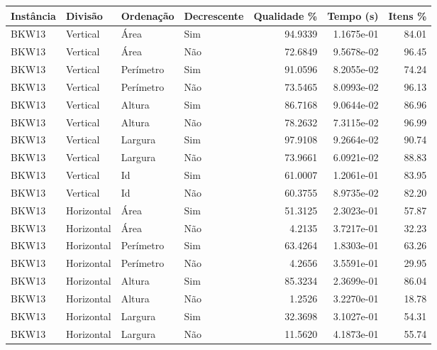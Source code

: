 \begin{tabular}{llllrrr}
    \hline
    Instância & Divisão    & Ordenação & Decrescente & Qualidade \% & Tempo (s)  & Itens \% \\
    \hline
    BKW13     & Vertical   & Área      & Sim         & 94.9339      & 1.1675e-01 & 84.01    \\
    BKW13     & Vertical   & Área      & Não         & 72.6849      & 9.5678e-02 & 96.45    \\
    BKW13     & Vertical   & Perímetro & Sim         & 91.0596      & 8.2055e-02 & 74.24    \\
    BKW13     & Vertical   & Perímetro & Não         & 73.5465      & 8.0993e-02 & 96.13    \\
    BKW13     & Vertical   & Altura    & Sim         & 86.7168      & 9.0644e-02 & 86.96    \\
    BKW13     & Vertical   & Altura    & Não         & 78.2632      & 7.3115e-02 & 96.99    \\
    BKW13     & Vertical   & Largura   & Sim         & 97.9108      & 9.2664e-02 & 90.74    \\
    BKW13     & Vertical   & Largura   & Não         & 73.9661      & 6.0921e-02 & 88.83    \\
    BKW13     & Vertical   & Id        & Sim         & 61.0007      & 1.2061e-01 & 83.95    \\
    BKW13     & Vertical   & Id        & Não         & 60.3755      & 8.9735e-02 & 82.20    \\
    BKW13     & Horizontal & Área      & Sim         & 51.3125      & 2.3023e-01 & 57.87    \\
    BKW13     & Horizontal & Área      & Não         & 4.2135       & 3.7217e-01 & 32.23    \\
    BKW13     & Horizontal & Perímetro & Sim         & 63.4264      & 1.8303e-01 & 63.26    \\
    BKW13     & Horizontal & Perímetro & Não         & 4.2656       & 3.5591e-01 & 29.95    \\
    BKW13     & Horizontal & Altura    & Sim         & 85.3234      & 2.3699e-01 & 86.04    \\
    BKW13     & Horizontal & Altura    & Não         & 1.2526       & 3.2270e-01 & 18.78    \\
    BKW13     & Horizontal & Largura   & Sim         & 32.3698      & 3.1027e-01 & 54.31    \\
    BKW13     & Horizontal & Largura   & Não         & 11.5620      & 4.1873e-01 & 55.74    \\

\end{tabular}
